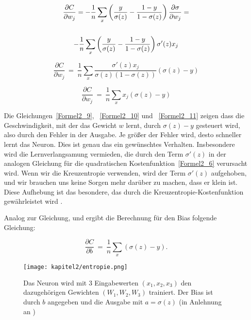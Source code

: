   \begin{gather} \label{Formel2_9}
    \frac{\partial C}{\partial w_{j}} =-\frac{1}{n}\sum _{x}\left(\frac{y}{\sigma ( z)} -\frac{1-y}{1-\sigma ( z)}\right)\frac{\partial \sigma }{\partial w_{j}} = \notag\\
    \notag\\
    -\frac{1}{n}\sum _{x}\left(\frac{y}{\sigma ( z)} -\frac{1-y}{1-\sigma ( z)}\right) \sigma '( z) x_{j} \notag\\
  \end{gather}

  \begin{equation} \label{Formel2_10}
    \frac{\partial C}{\partial w_{j}} \ =\ \frac{1}{n}\sum _{x}\frac{\sigma '( z) x_{j}}{\sigma ( z)( 1-\sigma ( z))}( \sigma ( z) -y)
  \end{equation}

  \begin{equation} \label{Formel2_11}
    \frac{\partial C}{\partial w_{j}} \ =\ \frac{1}{n}\sum _{x} x_{j}( \sigma ( z) -y)
  \end{equation}


  Die Gleichungen~\ref{Formel2_9}, ~\ref{Formel2_10} und ~\ref{Formel2_11} zeigen dass die Geschwindigkeit, mit der das Gewicht $w$  lernt, durch $\sigma(z) - y$ gesteuert wird, also durch den Fehler in der Ausgabe. Je größer der Fehler wird, desto schneller lernt das Neuron. Dies ist genau das ein gewünschtes Verhalten. Insbesondere wird die Lernverlangsamung vermieden, die durch den Term $\sigma'(z)$ in der analogen Gleichung für die quadratischen Kostenfunktion~\ref{Formel2_6} verursacht wird. Wenn wir die Kreuzentropie verwenden, wird der Term $\sigma'(z)$ aufgehoben, und wir brauchen uns keine Sorgen mehr darüber zu machen, dass er klein ist. Diese Aufhebung ist das besondere, das durch die Kreuzentropie-Kostenfunktion gewährleistet wird \cite[63-64]{Nielsen2015}.

  Analog zur Gleichung\label{Formel2_9}, \label{Formel2_10} und \label{Formel2_11} ergibt die Berechnung für den Bias folgende Gleichung:

  \begin{equation}
    \frac{\partial C}{\partial b} \ =\ \frac{1}{n}\sum _{x}( \sigma ( z) -y).
  \end{equation}

  \begin{figure}[H]
    \centering
    \texttt{[image: kapitel2/entropie.png]}
    \caption[Darstellung der Kreuzentropie am beispiel eines Neurons]{Das Neuron wird mit 3 Eingabewerten $(x_1, x_2, x_3)$ den dazugehörigen Gewichten $(W_1, W_2, W_3)$ trainiert. Der Bias ist durch $b$ angegeben und die Ausgabe mit $a = \sigma(z)$ (in Anlehnung an \cite*{Nielsen2015})}
    \label{Kap2:Entropie}
  \end{figure}

